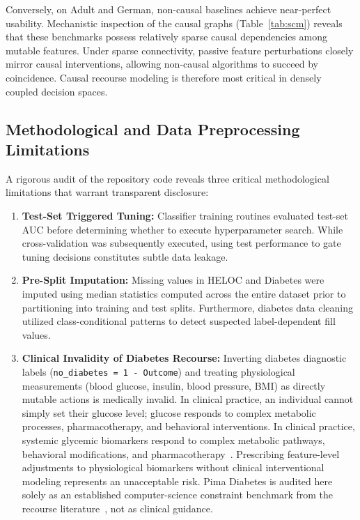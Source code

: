\documentclass[nolineno]{paper/ieee-access/ieeeaccess}%
\newcommand{\artifact}[1]{\nolinkurl{#1}}
\begin{document}
Conversely, on Adult and German, non-causal baselines achieve near-perfect usability. Mechanistic inspection of the causal graphs (Table~\ref{tab:scm}) reveals that these benchmarks possess relatively sparse causal dependencies among mutable features. Under sparse connectivity, passive feature perturbations closely mirror causal interventions, allowing non-causal algorithms to succeed by coincidence. Causal recourse modeling is therefore most critical in densely coupled decision spaces.

\subsection{Methodological and Data Preprocessing Limitations}
\label{sec:limitations}
A rigorous audit of the repository code reveals three critical methodological limitations that warrant transparent disclosure:
\begin{enumerate}
\item \textbf{Test-Set Triggered Tuning:} Classifier training routines evaluated test-set AUC before determining whether to execute hyperparameter search. While cross-validation was subsequently executed, using test performance to gate tuning decisions constitutes subtle data leakage.
\item \textbf{Pre-Split Imputation:} Missing values in HELOC and Diabetes were imputed using median statistics computed across the entire dataset prior to partitioning into training and test splits. Furthermore, diabetes data cleaning utilized class-conditional patterns to detect suspected label-dependent fill values.
\item \textbf{Clinical Invalidity of Diabetes Recourse:} Inverting diabetes diagnostic labels (\artifact{no_diabetes = 1 - Outcome}) and treating physiological measurements (blood glucose, insulin, blood pressure, BMI) as directly mutable actions is medically invalid. In clinical practice, an individual cannot simply set their glucose level; glucose responds to complex metabolic processes, pharmacotherapy, and behavioral interventions. In clinical practice, systemic glycemic biomarkers respond to complex metabolic pathways, behavioral modifications, and pharmacotherapy~\cite{smith1988diabetes}. Prescribing feature-level adjustments to physiological biomarkers without clinical interventional modeling represents an unacceptable risk. Pima Diabetes is audited here solely as an established computer-science constraint benchmark from the recourse literature~\cite{pawelczyk2021carla, klaise2021alibi}, not as clinical guidance.
\end{enumerate}
\end{document}
